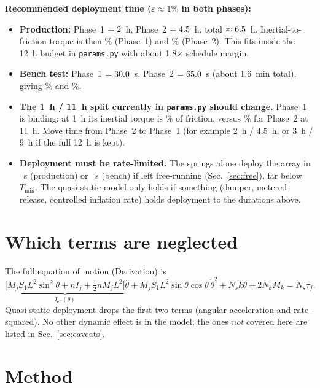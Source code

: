 \documentclass[11pt]{article}
\newcommand{\dth}{\dot{\theta}}
\newcommand{\ddth}{\ddot{\theta}}
\newcommand{\st}{\sin\theta}
\newcommand{\ct}{\cos\theta}
\newcommand{\Ieff}{I_{\text{eff}}}
\begin{document}
\textbf{Recommended deployment time ($\varepsilon\approx1\%$ in both phases):}
\begin{itemize}
  \item \textbf{Production:} Phase~1 $=2$~h, Phase~2 $=4.5$~h, total
        $\approx6.5$~h. Inertial-to-friction torque is then \recRaP\% (Phase~1) and
        \recRbP\% (Phase~2). This fits inside the 12~h budget in \texttt{params.py} with about 1.8$\times$ schedule margin.
  \item \textbf{Bench test:} Phase~1 $=30.0$~s, Phase~2 $=65.0$~s (about 1.6~min total), giving \recRaB\% and \recRbB\%.
  \item \textbf{The 1~h / 11~h split currently in \texttt{params.py} should change.} Phase~1 is
        binding: at 1~h its inertial torque is \curRaP\% of friction, versus \curRbP\% for Phase~2 at 11~h. Move time from Phase~2 to Phase~1 (for example 2~h / 4.5~h, or 3~h / 9~h if the full 12~h is kept).
  \item \textbf{Deployment must be rate-limited.} The springs alone deploy the array in
        \tfreeP~s (production) or \tfreeB~s (bench) if left free-running (Sec.~\ref{sec:free}),
        far below $T_{\min}$. The quasi-static model only holds if something (damper, metered
        release, controlled inflation rate) holds deployment to the durations above.
\end{itemize}

\section{Which terms are neglected}

The full equation of motion (Derivation) is
\begin{equation}
\underbrace{\big[M_j S_1 L^2\sin^2\theta + n I_j + \tfrac12 n M_j L^2\big]}_{\Ieff(\theta)}\ddth
+ M_j S_1 L^2\st\ct\,\dth^2 + N_s k\theta + 2N_k M_k = N_s\tau_f .
\end{equation}
Quasi-static deployment drops the first two terms (angular acceleration and rate-squared). No other
dynamic effect is in the model; the ones \emph{not} covered here are listed in Sec.~\ref{sec:caveats}.

\section{Method}
\end{document}
